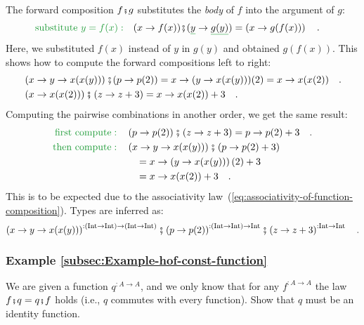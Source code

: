 The forward composition $f\bef g$ substitutes the \emph{body} of
$f$ into the argument of $g$:
\begin{align*}
{\color{greenunder}\text{substitute }y=f(x):}\quad & (x\rightarrow f(x))\bef(\gunderline y\rightarrow\gunderline{g(y)})=\left(x\rightarrow g(f(x))\right)\quad.
\end{align*}
Here, we substituted $f(x)$ instead of $y$ in $g(y)$ and obtained
$g(f(x))$. This shows how to compute the forward compositions left
to right:
\begin{align*}
 & \left(x\rightarrow y\rightarrow x(x(y))\right)\bef(p\rightarrow p(2))=x\rightarrow(y\rightarrow x(x(y)))(2)=x\rightarrow x(x(2))\quad.\\
 & \left(x\rightarrow x(x(2))\right)\bef\left(z\rightarrow z+3\right)=x\rightarrow x(x(2))+3\quad.
\end{align*}
Computing the pairwise combinations in another order, we get the same
result:
\begin{align*}
{\color{greenunder}\text{first compute}:}\quad & \left(p\rightarrow p(2)\right)\bef\left(z\rightarrow z+3\right)=p\rightarrow p(2)+3\quad.\\
{\color{greenunder}\text{then compute}:}\quad & \left(x\rightarrow y\rightarrow x(x(y))\right)\bef\left(p\rightarrow p(2)+3\right)\\
 & \quad=x\rightarrow\left(y\rightarrow x(x(y))\right)(2)+3\\
 & \quad=x\rightarrow x(x(2))+3\quad.
\end{align*}
This is to be expected due to the associativity law~(\ref{eq:associativity-of-function-composition}).
Types are inferred as: 
\[
\left(x\rightarrow y\rightarrow x(x(y))\right)^{:(\text{Int}\rightarrow\text{Int})\rightarrow(\text{Int}\rightarrow\text{Int})}\bef\left(p\rightarrow p(2)\right)^{:(\text{Int}\rightarrow\text{Int})\rightarrow\text{Int}}\bef\left(z\rightarrow z+3\right)^{:\text{Int}\rightarrow\text{Int}}\quad.
\]


\subsubsection{Example \label{subsec:Example-hof-const-function}\ref{subsec:Example-hof-const-function}}

We are given a function $q^{:A\rightarrow A}$, and we only know that
for any $f^{:A\rightarrow A}$ the law $f\bef q=q\bef f$ holds (i.e.,
$q$ commutes with every function). Show that $q$ must be an identity
function.

